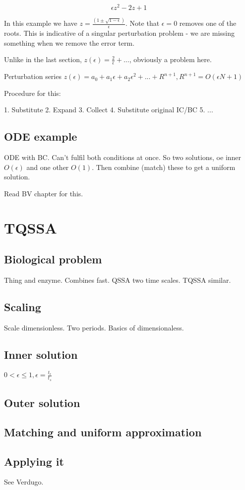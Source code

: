 \documentclass[12pt]{report}
\begin{document}
\begin{equation}
  \epsilon z^2 - 2z + 1
\end{equation}

In this example we have $z = \frac{(1 \pm \sqrt{1-\epsilon})}{\epsilon}$. Note
that $\epsilon=0$ removes one of the roots. This is indicative of a singular
perturbation problem - we are missing something when we remove the error term.

Unlike in the last section, $z(\epsilon) = \frac 2 \epsilon + ...$, obviously a
problem here.

Perturbation series $z(\epsilon) = a_0 + a_1 \epsilon + a_2 \epsilon^2 + ... +
R^{n+1}, R^{n+1} = O(\epsilon{N+1})$

Procedure for this:

1. Substitute
2. Expand
3. Collect
4. Substitute original IC/BC
5. ...

\section{ODE example}

ODE with BC. Can't fulfil both conditions at once. So two solutions, oe inner
$O(\epsilon)$ and one other $O(1)$. Then combine (match) these to get a uniform
solution.

Read BV chapter for this.

\chapter{TQSSA}

\section{Biological problem}

Thing and enzyme. Combines fast. QSSA two time scales. TQSSA similar.

\section{Scaling}

Scale dimensionless. Two periods. Basics of dimensionaless.

\section{Inner solution}

$0 < \epsilon \leq 1, \epsilon = \frac{t_{\epsilon}}{t_{s}}$

\section{Outer solution}

\section{Matching and uniform approximation}

\section{Applying it}

See Verdugo.


\end{document}
